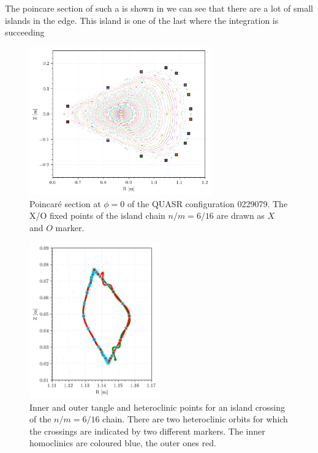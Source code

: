 The poincare section of such a is shown in  we can see that there are a lot of small islands in the edge. This island is one of the last where the integration is succeeding

\begin{figure}[H]
    \centering
    \includegraphics[width=0.7\textwidth]{images/quasrs/fixedpoint_0229079_1.png}
    \caption{Poincaré section at $\phi=0$ of the QUASR configuration 0229079. The X/O fixed points of the island chain $n/m = 6/16$ are drawn as $X$ and $O$ marker.}
    \label{fig:0229079-p}
\end{figure}

\begin{figure}[H]
    \centering
    \includegraphics[width=0.5\textwidth]{images/quasrs/clinic_outer_0229079.png}
    \caption{Inner and outer tangle and heteroclinic points for an island crossing of the $n/m  = 6/16$ chain. There are two heteroclinic orbits for which the crossings are indicated by two different markers. The inner homoclinics are coloured blue, the outer ones red.}
    \label{fig:0229079-turn}
\end{figure}

